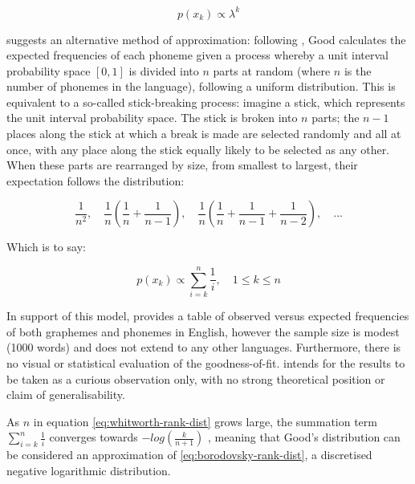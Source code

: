 \begin{equation}
p(x_k) \propto \lambda^k
\label{eq:sigurds-geometric}
\end{equation}

\textcite[p.577]{good_statistics_1969} suggests an alternative method of approximation: following \textcite{whitworth_choice_1901}, Good calculates the expected frequencies of each phoneme given a process whereby a unit interval probability space \([0,1]\) is divided into \(n\) parts at random (where \(n\) is the number of phonemes in the language), following a uniform distribution. This is equivalent to a so-called stick-breaking process: imagine a stick, which represents the unit interval probability space. The stick is broken into \(n\) parts; the \(n-1\) places along the stick at which a break is made are selected randomly and all at once, with any place along the stick equally likely to be selected as any other. When these parts are rearranged by size, from smallest to largest, their expectation follows the distribution:

\begin{equation}
\frac{1}{n^2},\quad \frac{1}{n} \left( \frac{1}{n} + \frac{1}{n-1} \right),\quad \frac{1}{n} \left( \frac{1}{n} + \frac{1}{n-1} + \frac{1}{n-2} \right),\quad ...
\label{eq:whitworth-dist}
\end{equation}

Which is to say:

\begin{equation}
p(x_k) \propto \sum_{i=k}^{n} \frac{1}{i}, \quad 1 \leq k \leq n
\label{eq:whitworth-rank-dist}
\end{equation}

In support of this model, \textcite[p.577]{good_statistics_1969} provides a table of observed versus expected frequencies of both graphemes and phonemes in English, however the sample size is modest (1000 words) and does not extend to any other languages. Furthermore, there is no visual or statistical evaluation of the goodness-of-fit. \textcite{good_statistics_1969} intends for the results to be taken as a curious observation only, with no strong theoretical position or claim of generalisability.

As \(n\) in equation \eqref{eq:whitworth-rank-dist} grows large, the summation term \(\sum_{i=k}^{n} \frac{1}{i}\) converges towards \(-log(\frac{k}{n+1})\) \autocite[p.~12]{loeb1989formal}, meaning that Good's distribution can be considered an approximation of \eqref{eq:borodovsky-rank-dist}, a discretised negative logarithmic distribution.

